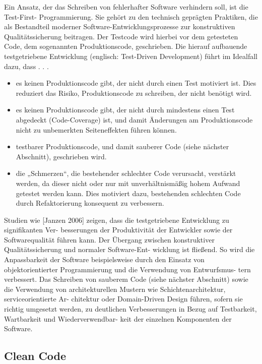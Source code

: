 Ein Ansatz, der das Schreiben von fehlerhafter Software verhindern soll, ist die Test-First-
Programmierung. Sie gehört zu den technisch geprägten Praktiken, die als Bestandteil moderner 
Software-Entwicklungsprozesse zur konstruktiven Qualitätssicherung beitragen.
Der Testcode wird hierbei vor dem getesteten Code, dem sogenannten Produktionscode,
geschrieben. Die hierauf aufbauende testgetriebene Entwicklung (englisch: Test-Driven
Development) führt im Idealfall dazu, dass . . .
\begin{itemize}
	\item es keinen Produktionscode gibt, der nicht durch einen Test motiviert ist. Dies reduziert das Risiko, Produktionscode zu schreiben, der nicht benötigt wird.

	\item  es keinen Produktionscode gibt, der nicht durch mindestens einen Test abgedeckt (Code-Coverage) ist, und damit Änderungen am Produktionscode nicht zu unbemerkten Seiteneffekten führen können.

	\item testbarer Produktionscode, und damit sauberer Code (siehe nächster Abschnitt), geschrieben wird.

	\item die „Schmerzen“, die bestehender schlechter Code verursacht, verstärkt werden, da dieser nicht oder nur mit unverhältnismäßig hohem Aufwand getestet werden kann. Dies motiviert dazu, bestehenden schlechten Code durch Refaktorierung konsequent zu verbessern.
\end{itemize}

Studien wie [Janzen 2006] zeigen, dass die testgetriebene Entwicklung zu signifikanten Ver-
besserungen der Produktivität der Entwickler sowie der Softwarequalität führen kann.
Der Übergang zwischen konstruktiver Qualitätssicherung und normaler Software-Ent-
wicklung ist fließend. So wird die Anpassbarkeit der Software beispielsweise durch den
Einsatz von objektorientierter Programmierung und die Verwendung von Entwurfsmus-
tern verbessert. Das Schreiben von sauberem Code (siehe nächster Abschnitt) sowie die
Verwendung von architekturellen Mustern wie Schichtenarchitektur, serviceorientierte Ar-
chitektur oder Domain-Driven Design führen, sofern sie richtig umgesetzt werden, zu
deutlichen Verbesserungen in Bezug auf Testbarkeit, Wartbarkeit und Wiederverwendbar-
keit der einzelnen Komponenten der Software.

\subsection{Clean Code}
